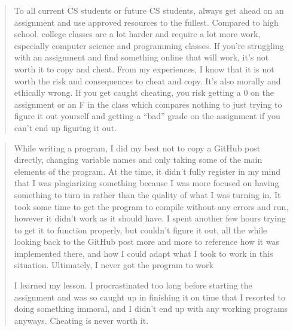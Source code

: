 \documentclass[12pt]{scrartcl}
\begin{document}
\begin{quote}
To all current CS students or future CS students, always get ahead on
an assignment and use approved resources to the fullest.  Compared to
high school, college classes are a lot harder and require a lot more
work, especially computer science and programming classes.  If you're
struggling with an assignment and find something online that will work,
it's not worth it to copy and cheat.  From my experiences, I know that
it is not worth the risk and consequences to cheat and copy.  It's also
morally and ethically wrong.  If you get caught cheating, you risk
getting a 0 on the assignment or an F in the class which compares
nothing to just trying to figure it out yourself and getting a ``bad''
grade on the assignment if you can't end up figuring it out.
\end{quote}

\begin{quote}
While writing a program, I did my best not to copy a GitHub post directly,
changing variable names and only taking some of the main elements of the
program. At the time, it didn't fully register in my mind that I was
plagiarizing something because I was more focused on having something
to turn in rather than the quality of what I was turning in. It took
some time to get the program to compile without any errors and run,
however it didn't work as it should have. I spent another few hours
trying to get it to function properly, but couldn't figure it out,
all the while looking back to the GitHub post more and more to reference
how it was implemented there, and how I could adapt what I took to work
in this situation. Ultimately, I never got the program to work

I learned my lesson. I procrastinated too long before starting the assignment and was so caught up in finishing it on time that I resorted to doing something immoral, and I didn't end up with any working programs anyways. Cheating is never worth it.
\end{quote}
\end{document}
